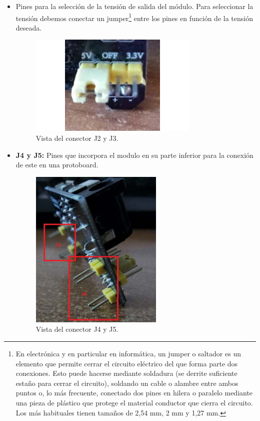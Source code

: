\begin{itemize}
  \item {} Pines para la selección de la tensión de salida del módulo. Para seleccionar la tensión debemos conectar un jumper\footnote{En electrónica y en particular en informática,
   un jumper o saltador es un elemento que permite cerrar el circuito eléctrico del que forma parte dos conexiones. Esto puede hacerse mediante soldadura (se derrite suficiente estaño para cerrar el circuito), soldando un cable o alambre entre ambos puntos o, lo más frecuente, conectado dos pines en hilera o paralelo mediante una pieza de plástico que protege el material conductor que cierra el circuito. Los más habituales tienen tamaños de 2,54 mm, 2 mm y 1,27 mm. } entre los pines en función de la
  tensión deseada.

   \begin{figure}[H]
  \begin{center}
    \includegraphics[scale=0.5]{imagenes/usb_board_vout.png}
  \end{center}
  \caption{Vista del conector J2 y J3.}
  \label{figura:conector_usb_board_vout}
\end{figure}

\item \textbf{J4 y J5:} Pines que incorpora el modulo en su parte inferior para la conexión de este en 
una protoboard.

   \begin{figure}[H]
  \begin{center}
    \includegraphics[scale=0.5]{imagenes/pin_usb_board.png}
  \end{center}
  \caption{Vista del conector J4 y J5.}
  \label{figura:conector_usb_board}
\end{figure}
  
\end{itemize}


